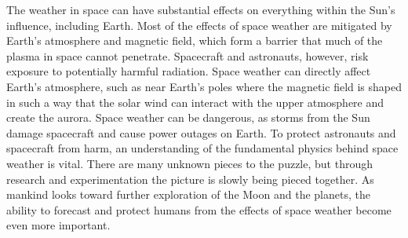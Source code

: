 The weather in space can have substantial effects on everything within the Sun's influence, including Earth. Most of the effects of space weather are mitigated by Earth's atmosphere and magnetic field, which form a barrier that much of the plasma in space cannot penetrate. Spacecraft and astronauts, however, risk exposure to potentially harmful radiation. Space weather can directly affect Earth's atmosphere, such as near Earth's poles where the magnetic field is shaped in such a way that the solar wind can interact with the upper atmosphere and create the aurora. Space weather can be dangerous, as storms from the Sun damage spacecraft and cause power outages on Earth. To protect astronauts and spacecraft from harm, an understanding of the fundamental physics behind space weather is vital. There are many unknown pieces to the puzzle, but through research and experimentation the picture is slowly being pieced together. As mankind looks toward further exploration of the Moon and the planets, the ability to forecast and protect humans from the effects of space weather become even more important.
%
